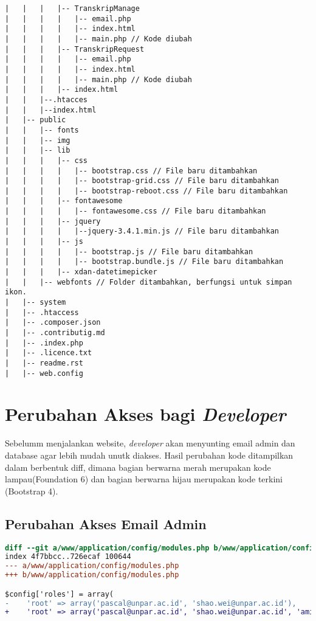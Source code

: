 \begin{lstlisting}[basicstyle=\ttfamily, frame=single,
columns=fullflexible, keepspaces=true, breaklines=true, label=ls:8]
|   |   |   |-- TranskripManage
|   |   |   |   |-- email.php
|   |   |   |   |-- index.html
|   |   |   |   |-- main.php // Kode diubah
|   |   |   |-- TranskripRequest
|   |   |   |   |-- email.php
|   |   |   |   |-- index.html
|   |   |   |   |-- main.php // Kode diubah
|   |   |   |-- index.html
|   |   |--.htacces
|   |   |--index.html
|   |-- public
|   |   |-- fonts
|   |   |-- img
|   |   |-- lib 
|   |   |   |-- css
|   |   |   |   |-- bootstrap.css // File baru ditambahkan
|   |   |   |   |-- bootstrap-grid.css // File baru ditambahkan
|   |   |   |   |-- bootstrap-reboot.css // File baru ditambahkan
|   |   |   |-- fontawesome
|   |   |   |   |-- fontawesome.css // File baru ditambahkan
|   |   |   |-- jquery
|   |   |   |   |--jquery-3.4.1.min.js // File baru ditambahkan
|   |   |   |-- js
|   |   |   |   |-- bootstrap.js // File baru ditambahkan
|   |   |   |   |-- bootstrap.bundle.js // File baru ditambahkan
|   |   |   |-- xdan-datetimepicker
|   |   |-- webfonts // Folder ditambahkan, berfungsi untuk simpan ikon.
|   |-- system
|   |-- .htaccess
|   |-- .composer.json
|   |-- .contributig.md
|   |-- .index.php
|   |-- .licence.txt
|   |-- readme.rst
|   |-- web.config
\end{lstlisting}

\section{Perubahan Akses bagi \textit{Developer}}
Sebelumm menjalankan website, \textit{developer} akan menyunting email admin dan database agar lebih mudah unutk diakses. Hasil perubahan kode ditampilkan dalam berbentuk diff, dimana bagian berwarna merah merupakan kode lampau(Foundation 6) dan bagian berwarna hijau merupakan kode terkini  (Bootstrap 4).
\subsection{Perubahan Akses Email Admin}
\begin{lstlisting}[language=diff, caption=Perubahan Akses Email Admin, label=Entri, basicstyle=\ttfamily, frame=single,
columns=fullflexible, keepspaces=true, breaklines=true]
diff --git a/www/application/config/modules.php b/www/application/config/modules.php
index 4f7bbcc..726ecaf 100644
--- a/www/application/config/modules.php
+++ b/www/application/config/modules.php

$config['roles'] = array(
-    'root' => array('pascal@unpar.ac.id', 'shao.wei@unpar.ac.id'),
+    'root' => array('pascal@unpar.ac.id', 'shao.wei@unpar.ac.id', 'amihapsahapsa@gmail.com'),

\end{lstlisting}


